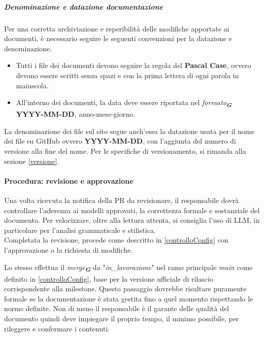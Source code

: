 \documentclass[a4paper,12pt]{article}
\newcommand{\glossario}[1]{\textit{#1}\textsubscript{\textbf{\textit{\textcolor{lightblack}{G}}}}}
\begin{document}
\subparagraph{Denominazione e datazione documentazione}\label{convenzioniNomiDate}
Per una corretta archiviazione e reperibilità delle modifiche apportate ai
documenti, è necessario seguire le seguenti convenzioni per la datazione e
denominazione.
\begin{itemize}
    \item Tutti i file dei documenti devono seguire la regola del \textbf{Pascal Case},
          ovvero devono essere scritti senza spazi e con la prima lettera di ogni parola
          in maiuscola.
    \item All'interno dei documenti, la data deve essere riportata nel \glossario{formato}
          \textbf{YYYY-MM-DD}, anno-mese-giorno.
\end{itemize}
La denominazione dei file sul sito segue anch'essa la datazione usata per il nome dei file su GitHub ovvero \textbf{YYYY-MM-DD}, con l'aggiunta del numero di versione alla fine del nome. Per le specifiche di versionamento, si rimanda alla sezione \ref{versione}.

\paragraph{Procedura: revisione e approvazione} \label{revisione_approvazione}

Una volta ricevuta la notifica della PR da revisionare, il responsabile dovrà
controllare l'aderenza ai modelli approvati, la correttezza formale e
sostanziale del documento. Per velocizzare, oltre alla lettura attenta, si
consiglia l'uso di LLM, in particolare per l'analisi grammaticale e stilistica.
\\Completata la revisione, procede come descritto in \ref{controlloConfig} con
l'approvazione o la richiesta di modifiche.

Lo stesso effettua il \glossario{merge} da "\textit{in\_lavorazione}" nel ramo principale
\textit{main} come definito in \ref{controlloConfig}, base per la versione
ufficiale di rilascio corrispondente alla milestone. Questo passaggio dovrebbe
risultare puramente formale se la documentazione è stata gestita fino a quel
momento rispettando le norme definite. Non di meno il responsabile è il garante
delle qualità del documento quindi deve impiegare il proprio tempo, il minimo
possibile, per rileggere e confermare i contenuti.
\end{document}
